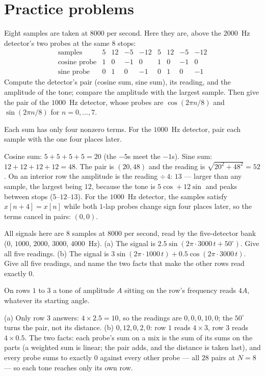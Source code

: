 \section*{Practice problems}

\begin{problem}
Eight samples are taken at $8000$ per second. Here they are, above the
$2000$~Hz detector's two probes at the same $8$ stops:
\[
\begin{array}{lrrrrrrrr}
  \text{samples} & 5 & 12 & -5 & -12 & 5 & 12 & -5 & -12 \\
  \text{cosine probe} & 1 & 0 & -1 & 0 & 1 & 0 & -1 & 0 \\
  \text{sine probe} & 0 & 1 & 0 & -1 & 0 & 1 & 0 & -1
\end{array}
\]
Compute the detector's pair (cosine sum, sine sum), its reading, and
the amplitude of the tone; compare the amplitude with the largest
sample. Then give the pair of the $1000$~Hz detector, whose probes are
$\cos(2\pi n/8)$ and $\sin(2\pi n/8)$ for $n = 0, \ldots, 7$.
\begin{hint}
Each sum has only four nonzero terms. For the $1000$~Hz detector, pair
each sample with the one four places later.
\end{hint}
\begin{solution}
Cosine sum: $5 + 5 + 5 + 5 = 20$ (the $-5$s meet the $-1$s). Sine sum:
$12 + 12 + 12 + 12 = 48$. The pair is $(20, 48)$ and the reading is
$\sqrt{20^2 + 48^2} = 52$. On an interior row the amplitude is the
reading $\div\, 4$: $13$ — larger than any sample, the largest being
$12$, because the tone is $5 \cos + 12 \sin$ and peaks between stops
($5$–$12$–$13$). For the $1000$~Hz detector, the samples satisfy $x[n +
4] = x[n]$ while both $1$-lap probes change sign four places later, so
the terms cancel in pairs: $(0, 0)$.
\end{solution}
\end{problem}

\begin{problem}
All signals here are $8$ samples at $8000$ per second, read by the
five-detector bank ($0$, $1000$, $2000$, $3000$, $4000$~Hz). (a) The
signal is $2.5 \sin(2\pi \cdot 3000\, t + 50^\circ)$. Give all five
readings. (b) The signal is $3 \sin(2\pi \cdot 1000\, t) + 0.5
\cos(2\pi \cdot 3000\, t)$. Give all five readings, and name the two
facts that make the other rows read exactly $0$.
\begin{hint}
On rows $1$ to $3$ a tone of amplitude $A$ sitting on the row's
frequency reads $4A$, whatever its starting angle.
\end{hint}
\begin{solution}
(a) Only row $3$ answers: $4 \times 2.5 = 10$, so the readings are $0,
0, 0, 10, 0$; the $50^\circ$ turns the pair, not its distance. (b) $0,
12, 0, 2, 0$: row $1$ reads $4 \times 3$, row $3$ reads $4 \times 0.5$.
The two facts: each probe's sum on a mix is the sum of its sums on the
parts (a weighted sum is linear; the pair adds, and the distance is
taken last), and every probe sums to exactly $0$ against every other
probe — all $28$ pairs at $N = 8$ — so each tone reaches only its own
row.
\end{solution}
\end{problem}

